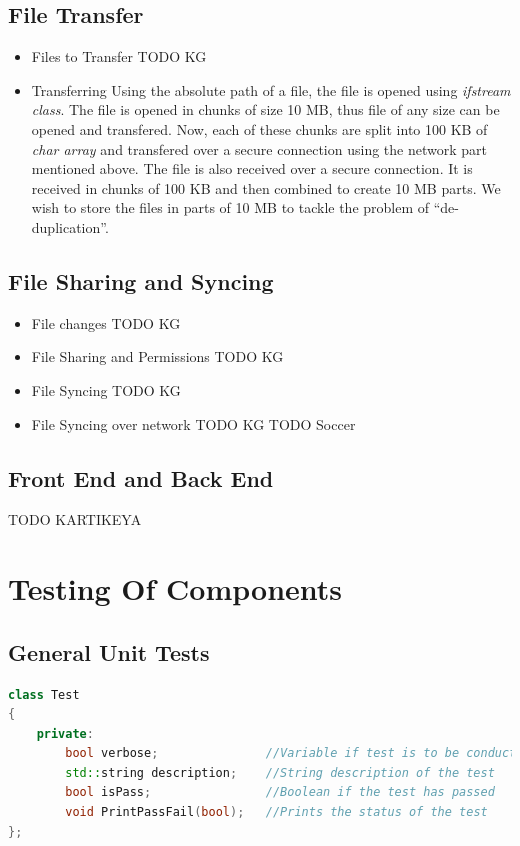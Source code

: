 \documentclass{article}
\begin{document}
			\subsection{File Transfer}
				\begin{itemize}
					\item Files to Transfer
						TODO KG
					\item Transferring
						\newline
						Using the absolute path of a file, the file is opened using \textit{ifstream class}. The file is opened in chunks of size 10 MB, thus file of any size can be opened and transfered.
						Now, each of these chunks are split into 100 KB of \textit{char array} and transfered over a secure connection using the network part mentioned above.
						\newline
						The file is also received over a secure connection. It is received in chunks of 100 KB and then combined to create 10 MB parts. We wish to store the files in parts of 10 MB to tackle the problem of ``de-duplication''.
				\end{itemize}	
			\subsection{File Sharing and Syncing}
				\begin{itemize}
					\item File changes
						TODO KG
					\item File Sharing and Permissions
						TODO KG
					\item File Syncing
						TODO KG
					\item File Syncing over network
						TODO KG
						TODO Soccer
				\end{itemize}
			\subsection{Front End and Back End}
				TODO KARTIKEYA 

	\section{Testing Of Components}
			\subsection{General Unit Tests}
				\begin{lstlisting}[language=C++, caption={Class Parameters for Test}]
class Test
{
	private:
		bool verbose;               //Variable if test is to be conducted
		std::string description;    //String description of the test
		bool isPass;                //Boolean if the test has passed 
		void PrintPassFail(bool);   //Prints the status of the test
};
				\end{lstlisting}
\end{document}
